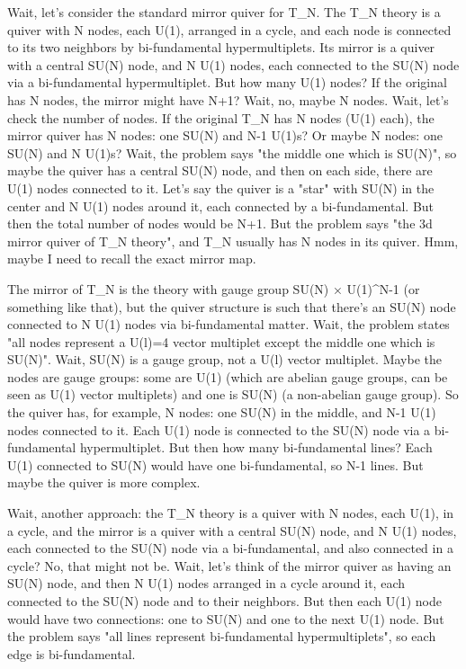 Wait, let's consider the standard mirror quiver for T_N. The T_N theory is a quiver with N nodes, each U(1), arranged in a cycle, and each node is connected to its two neighbors by bi-fundamental hypermultiplets. Its mirror is a quiver with a central SU(N) node, and N U(1) nodes, each connected to the SU(N) node via a bi-fundamental hypermultiplet. But how many U(1) nodes? If the original has N nodes, the mirror might have N+1? Wait, no, maybe N nodes. Wait, let's check the number of nodes. If the original T_N has N nodes (U(1) each), the mirror quiver has N nodes: one SU(N) and N-1 U(1)s? Or maybe N nodes: one SU(N) and N U(1)s? Wait, the problem says "the middle one which is SU(N)", so maybe the quiver has a central SU(N) node, and then on each side, there are U(1) nodes connected to it. Let's say the quiver is a "star" with SU(N) in the center and N U(1) nodes around it, each connected by a bi-fundamental. But then the total number of nodes would be N+1. But the problem says "the 3d mirror quiver of T_N theory", and T_N usually has N nodes in its quiver. Hmm, maybe I need to recall the exact mirror map. 

The mirror of T_N is the theory with gauge group SU(N) × U(1)^{N-1} (or something like that), but the quiver structure is such that there's an SU(N) node connected to N U(1) nodes via bi-fundamental matter. Wait, the problem states "all nodes represent a U(l)=4 vector multiplet except the middle one which is SU(N)". Wait, SU(N) is a gauge group, not a U(l) vector multiplet. Maybe the nodes are gauge groups: some are U(1) (which are abelian gauge groups, can be seen as U(1) vector multiplets) and one is SU(N) (a non-abelian gauge group). So the quiver has, for example, N nodes: one SU(N) in the middle, and N-1 U(1) nodes connected to it. Each U(1) node is connected to the SU(N) node via a bi-fundamental hypermultiplet. But then how many bi-fundamental lines? Each U(1) connected to SU(N) would have one bi-fundamental, so N-1 lines. But maybe the quiver is more complex. 

Wait, another approach: the T_N theory is a quiver with N nodes, each U(1), in a cycle, and the mirror is a quiver with a central SU(N) node, and N U(1) nodes, each connected to the SU(N) node via a bi-fundamental, and also connected in a cycle? No, that might not be. Wait, let's think of the mirror quiver as having an SU(N) node, and then N U(1) nodes arranged in a cycle around it, each connected to the SU(N) node and to their neighbors. But then each U(1) node would have two connections: one to SU(N) and one to the next U(1) node. But the problem says "all lines represent bi-fundamental hypermultiplets", so each edge is bi-fundamental. 

